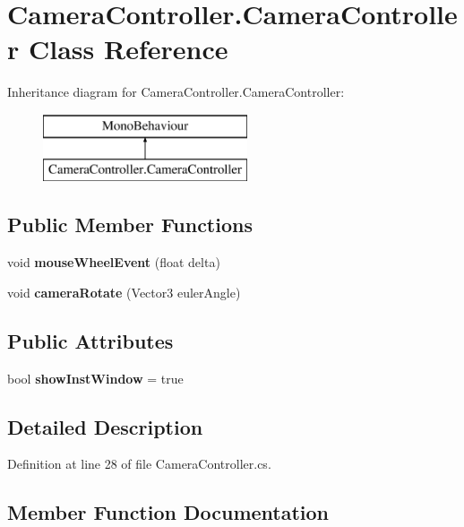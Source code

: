 \section{Camera\+Controller.\+Camera\+Controller Class Reference}
\label{class_camera_controller_1_1_camera_controller}
Inheritance diagram for Camera\+Controller.\+Camera\+Controller\+:\begin{figure}[H]
\begin{center}
\leavevmode
\includegraphics[height=2.000000cm]{class_camera_controller_1_1_camera_controller}
\end{center}
\end{figure}
\subsection*{Public Member Functions}
\begin{DoxyCompactItemize}
\item 
void \textbf{ mouse\+Wheel\+Event} (float delta)
\item 
void \textbf{ camera\+Rotate} (Vector3 euler\+Angle)
\end{DoxyCompactItemize}
\subsection*{Public Attributes}
\begin{DoxyCompactItemize}
\item 
bool \textbf{ show\+Inst\+Window} = true
\end{DoxyCompactItemize}


\subsection{Detailed Description}


Definition at line 28 of file Camera\+Controller.\+cs.



\subsection{Member Function Documentation}
\mbox{\label{class_camera_controller_1_1_camera_controller_ab1e9bc658351c99bfea662617d99e35b}} 
